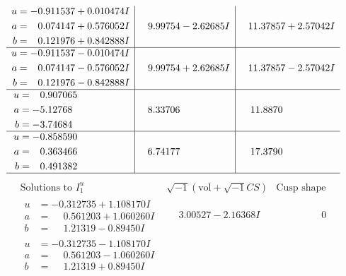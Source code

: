\documentclass[1p]{elsarticle_modified}
\theoremstyle{definition}
\newcommand{\I}{\sqrt{-1}}
\begin{document}
$$\begin{array}{c|c|c}
\begin{aligned}
u &= -0.911537 + 0.010474 I \\
a &= \phantom{-}0.074147 + 0.576052 I \\
b &= \phantom{-}0.121976 + 0.842888 I\end{aligned}
 & \phantom{-}9.99754 - 2.62685 I & \phantom{-}11.37857 + 2.57042 I \\ \hline\begin{aligned}
u &= -0.911537 - 0.010474 I \\
a &= \phantom{-}0.074147 - 0.576052 I \\
b &= \phantom{-}0.121976 - 0.842888 I\end{aligned}
 & \phantom{-}9.99754 + 2.62685 I & \phantom{-}11.37857 - 2.57042 I \\ \hline\begin{aligned}
u &= \phantom{-}0.907065\phantom{ +0.000000I} \\
a &= -5.12768\phantom{ +0.000000I} \\
b &= -3.74684\phantom{ +0.000000I}\end{aligned}
 & \phantom{-}8.33706\phantom{ +0.000000I} & \phantom{-}11.8870\phantom{ +0.000000I} \\ \hline\begin{aligned}
u &= -0.858590\phantom{ +0.000000I} \\
a &= \phantom{-}0.363466\phantom{ +0.000000I} \\
b &= \phantom{-}0.491382\phantom{ +0.000000I}\end{aligned}
 & \phantom{-}6.74177\phantom{ +0.000000I} & \phantom{-}17.3790\phantom{ +0.000000I}\\
 \hline 
 \end{array}$$\newpage$$\begin{array}{c|c|c}  
\text{Solutions to }I^u_{1}& \I (\text{vol} + \sqrt{-1}CS) & \text{Cusp shape}\\
 \hline 
\begin{aligned}
u &= -0.312735 + 1.108170 I \\
a &= \phantom{-}0.561203 + 1.060260 I \\
b &= \phantom{-}1.21319 - 0.89450 I\end{aligned}
 & \phantom{-}3.00527 - 2.16368 I & \phantom{-0.000000 } 0 \\ \hline\begin{aligned}
u &= -0.312735 - 1.108170 I \\
a &= \phantom{-}0.561203 - 1.060260 I \\
b &= \phantom{-}1.21319 + 0.89450 I\end{aligned}

\end{array}$$
\end{document}
